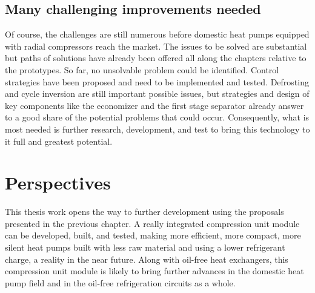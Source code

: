 \vspace{1em}

\subsection{Many challenging improvements needed}
\label{sec:concl-improvements}

Of course, the challenges are still numerous before domestic heat
pumps equipped with radial compressors reach the market. The issues to
be solved are substantial but paths of solutions have already been
offered all along the chapters relative to the prototypes. So far, no
unsolvable problem could be identified. Control strategies have been
proposed and need to be implemented and tested. Defrosting and cycle
inversion are still important possible issues, but strategies and
design of key components like the economizer and the first stage
separator already answer to a good share of the potential problems
that could occur. Consequently, what is most needed is further
research, development, and test to bring this technology to it full
and greatest potential.

\vspace{1em}

\section{Perspectives}
\label{sec:perspectives}

This thesis work opens the way to further development using the
proposals presented in the previous chapter. A really integrated
compression unit module can be developed, built, and tested, making
more efficient, more compact, more silent heat pumps built with less
raw material and using a lower refrigerant charge, a reality in the
near future. Along with oil-free heat exchangers, this compression
unit module is likely to bring further advances in the domestic heat
pump field and in the oil-free refrigeration circuits as a whole.
